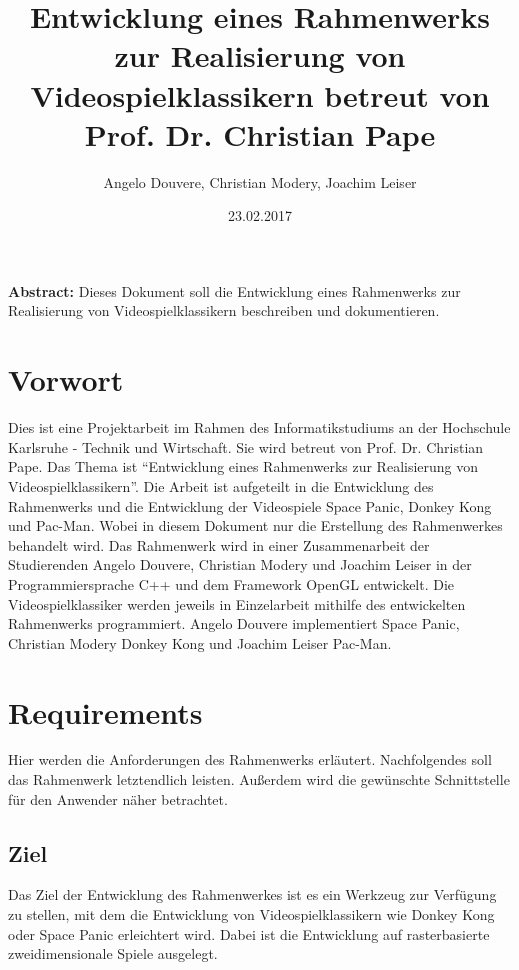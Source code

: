 \documentclass[a4paper, 11pt]{article}
\begin{document}
\author{Angelo Douvere, Christian Modery, Joachim Leiser}
\title{Entwicklung eines Rahmenwerks zur Realisierung von Videospielklassikern betreut von Prof. Dr. Christian Pape}
\date{23.02.2017}
\maketitle

\pagebreak

\textbf{Abstract:} Dieses Dokument soll die Entwicklung eines Rahmenwerks zur Realisierung von Videospielklassikern beschreiben und dokumentieren.



\tableofcontents

\pagebreak

\section{Vorwort} %

Dies ist eine Projektarbeit im Rahmen des Informatikstudiums an der Hochschule Karlsruhe - Technik und Wirtschaft. Sie wird betreut von Prof. Dr. Christian Pape. Das Thema ist "`Entwicklung eines Rahmenwerks zur Realisierung von Videospielklassikern"'. Die Arbeit ist aufgeteilt in die Entwicklung des Rahmenwerks und die Entwicklung der Videospiele Space Panic, Donkey Kong und Pac-Man. Wobei in diesem Dokument nur die Erstellung des Rahmenwerkes behandelt wird. Das Rahmenwerk wird in einer Zusammenarbeit der Studierenden Angelo Douvere, Christian Modery und Joachim Leiser in der Programmiersprache C++ und dem Framework OpenGL entwickelt. Die Videospielklassiker werden jeweils in Einzelarbeit mithilfe des entwickelten Rahmenwerks programmiert. Angelo Douvere implementiert Space Panic, Christian Modery Donkey Kong und Joachim Leiser Pac-Man. 



\section{Requirements}
Hier werden die Anforderungen des Rahmenwerks erläutert. Nachfolgendes soll das Rahmenwerk letztendlich leisten. Außerdem wird die gewünschte Schnittstelle für den Anwender näher betrachtet. 


\subsection{Ziel}
Das Ziel der Entwicklung des Rahmenwerkes ist es ein Werkzeug zur Verfügung zu stellen, mit dem die Entwicklung von Videospielklassikern wie Donkey Kong oder Space Panic erleichtert wird. Dabei ist die Entwicklung auf rasterbasierte zweidimensionale Spiele ausgelegt. 
\end{document}
